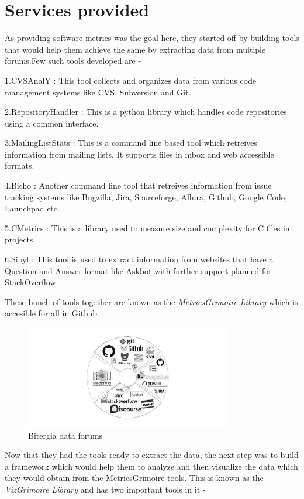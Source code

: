 \documentclass[double,12pt]{beavtex}
\begin{document}
\section{Services provided}
As providing software metrics was the goal here, they started off by building tools that would help them achieve the same by extracting data from multiple forums.Few such tools developed are - 

1.CVSAnalY : This tool collects and organizes data from various code management systems like CVS, Subversion and Git.

2.RepositoryHandler : This is a python library which handles code repositories using a common interface.

3.MailingListStats : This is a command line based tool which retreives information from mailing lists. It supports files in mbox and web accessible formats.

4.Bicho : Another command line tool that retreives information from issue tracking systems like Bugzilla, Jira, Sourceforge, Allura, Github, Google Code, Launchpad etc.

5.CMetrics : This is a library used to measure size and complexity for C files in projects.

6.Sibyl : This tool is used to extract information from websites that have a Question-and-Answer format like Askbot with further support planned for StackOverflow.

These bunch of tools together are known as the \emph{MetricsGrimoire Library} which is accesible for all in Github.

\begin{figure}[!ht]
\centering
\includegraphics[width=90mm]{bitergia.jpg}
\caption{Bitergia data forums}
\end{figure}

Now that they had the tools ready to extract the data, the next step was to build a framework which would help them to analyze and then visualize the data which they would obtain from the MetricsGrimoire tools. This is known as the \emph{VizGrimoire Library} and has two important tools in it -
\end{document}
